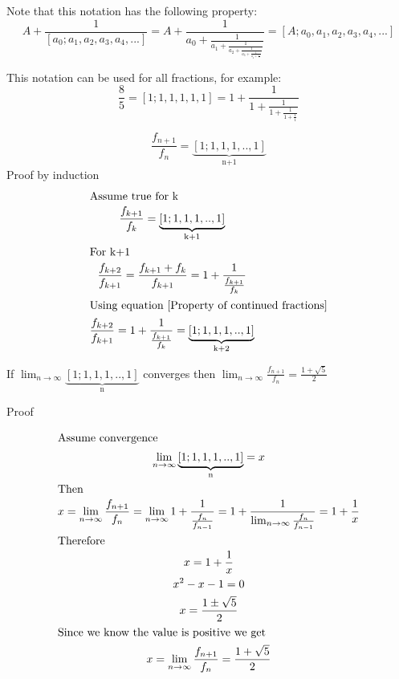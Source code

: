 \documentclass[a4paper]{article}
\begin{document}
Note that this notation has the following property:
\begin{equation}\label{Property of continued fractions}
A + \frac{1}{[a_0;a_1,a_2,a_3,a_4, ...]} = A + \frac{1}{a_0 + \frac{1}{a_1 + \frac{1}{a_2 + \frac{1}{a_3 +  \frac{1}{a_4 + \frac{1}{...}}}}}}
= [A; a_0,a_1,a_2,a_3,a_4, ...]
\end{equation}

This notation can be used for all fractions, for example: 
\begin{equation*}
\frac{8}{5} = [1;1,1,1,1, 1] =  1 + \frac{1}{1 + \frac{1}{1 + \frac{1}{1 + \frac{1}{1} }}}
\end{equation*}

\begin{theorem}
$$
\frac{f_{n+1}}{f_{n}} = \underbrace{[1;1,1,1,..,1]}_\text{n+1}
$$
Proof by induction
\begin{gather*}
\shortintertext{Assume true for k}
\frac{f_{k+1}}{f_{k}} = \underbrace{[1;1,1,1,..,1]}_\text{k+1} \\
\shortintertext{For k+1}
\frac{f_{k+2}}{f_{k+1}} = \frac{f_{k+1} + f_{k}}{f_{k+1}} = 1 + \frac{1}{\frac{f_{k+1}}{f_{k}}}
\\
\shortintertext{Using equation \ref{Property of continued fractions}}
\frac{f_{k+2}}{f_{k+1}} = 1 + \frac{1}{\frac{f_{k+1}}{f_{k}}} = \underbrace{[1;1,1,1,..,1]}_\text{k+2}\\
\end{gather*}
\end{theorem}

\begin{theorem}
If $\lim_{n \to \infty} \underbrace{[1;1,1,1,..,1]}_\text{n} $ converges then  $\lim_{n \to \infty} \frac{f_{n+1}}{f_{n}} = \frac{1+ \sqrt{5}}{2} $

Proof

\begin{gather*}
\shortintertext{Assume convergence}
\lim_{n \to \infty} \underbrace{[1;1,1,1,..,1]}_\text{n} = x\\
\shortintertext{Then}
x = \lim_{n \to \infty} \frac{f_{n+1}}{f_{n}} = \lim_{n \to \infty} 1 + \frac{1}{\frac{f_{n}}{f_{n-1}}} =  1 + \frac{1}{ \lim_{n \to \infty} \frac{f_{n}}{f_{n-1}}} = 1 + \frac{1}{x} \\
\shortintertext{Therefore}
x = 1 + \frac{1}{x}\\
x^2 - x  -1 = 0\\
x= \frac{1 \pm \sqrt{5}}{2}\\
\shortintertext{Since we know the value is positive we get}
x = \lim_{n \to \infty} \frac{f_{n+1}}{f_{n}}= \frac{1 + \sqrt{5}}{2}\\
\end{gather*}
\end{theorem}
\end{document}
